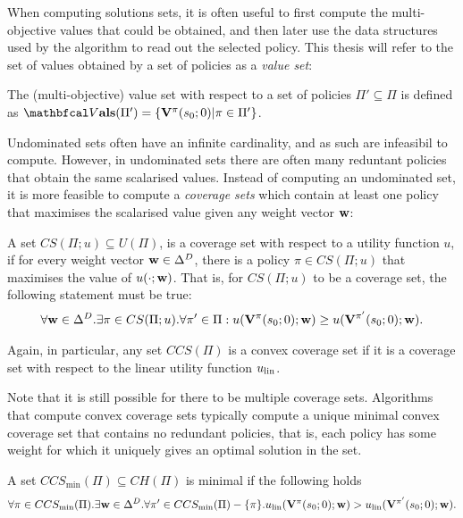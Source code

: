     When computing solutions sets, it is often useful to first compute the multi-objective values that could be obtained, and then later use the data structures used by the algorithm to read out the selected policy. This thesis will refer to the set of values obtained by a set of policies as a \textit{value set}:
    \begin{defn}
        \label{def:mo_value_set}
        The \textnormal{(multi-objective) value set} with respect to a set of policies $\Pi'\subseteq\Pi$ is defined as $\valset(\Pi') = \{\bff{V}^{\pi}(s_0;0) | \pi \in \Pi'\}$.
    \end{defn}

    Undominated sets often have an infinite cardinality, and as such are infeasibil to compute. However, in undominated sets there are often many reduntant policies that obtain the same scalarised values. Instead of computing an undominated set, it is more feasible to compute a \textit{coverage sets} which contain at least one policy that maximises the scalarised value given any weight vector $\mathbf{w}$:
    \begin{defn}
        \label{def:coverage_set}
        \label{def:convex_coverage_set}
        A set $CS(\Pi;u)\subseteq U(\Pi)$, is a \textnormal{coverage set} with respect to a utility function $u$, if for every weight vector $\mathbf{w}\in\Delta^D$, there is a policy $\pi\in CS(\Pi;u)$ that maximises the value of $u(\cdot;\mathbf{w})$. That is, for $CS(\Pi;u)$ to be a coverage set, the following statement must be true:
        \begin{align}
            \forall \mathbf{w}\in\Delta^D. \exists \pi\in CS(\Pi;u). \forall \pi'\in\Pi: u(\mathbf{V}^{\pi}(s_0;0);\mathbf{w}) \geq u(\mathbf{V}^{\pi'}(s_0;0);\mathbf{w}). \label{cond:coverage_set}
        \end{align}

        Again, in particular, any set $CCS(\Pi)$ is a \textnormal{convex coverage set} if it is a coverage set with respect to the linear utility function $u_{{\textnormal{lin}}}$. 
    \end{defn}

    Note that it is still possible for there to be multiple coverage sets. Algorithms that compute convex coverage sets typically compute a unique minimal convex coverage set that contains no redundant policies, that is, each policy has some weight for which it uniquely gives an optimal solution in the set.
    \begin{defn}
        \label{def:min_convex_coverage_set}
        A set $CCS_{\min}(\Pi)\subseteq CH(\Pi)$ is minimal if the following holds
        \begin{align}
         \forall \pi\in CCS_{\min}(\Pi). \exists \mathbf{w}\in\Delta^D. \forall \pi'\in CCS_{\min}(\Pi)-\{\pi\}. u_{{\textnormal{lin}}}(\mathbf{V}^{\pi}(s_0;0);\mathbf{w}) > u_{{\textnormal{lin}}}(\mathbf{V}^{\pi'}(s_0;0);\mathbf{w}).
        \end{align}
    \end{defn} 

